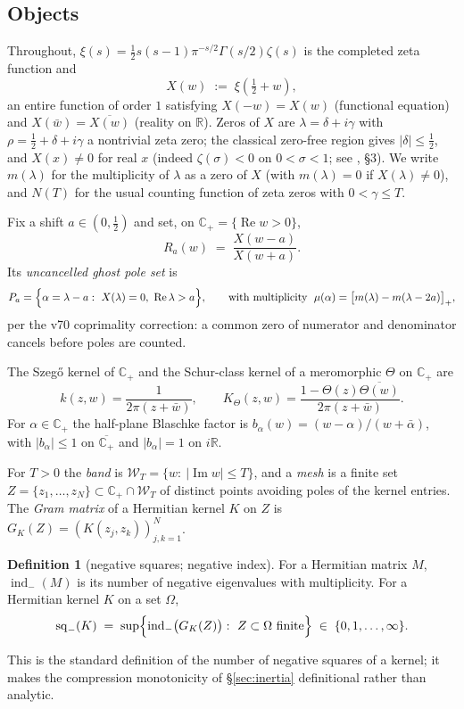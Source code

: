 \documentclass[11pt]{article}
\theoremstyle{definition}
\newtheorem{definition}[theorem]{Definition}
\theoremstyle{remark}
\newcommand{\CP}{\mathbb{C}_{+}}
\newcommand{\R}{\mathbb{R}}
\newcommand{\indm}{\operatorname{ind}_{-}}
\newcommand{\sq}{\operatorname{sq}_{-}}
\newcommand{\re}{\operatorname{Re}}
\newcommand{\im}{\operatorname{Im}}
\newcommand{\band}[1]{\mathcal{W}_{#1}}
\begin{document}
\subsection{Objects}

Throughout, $\xi(s)=\tfrac12 s(s-1)\pi^{-s/2}\Gamma(s/2)\zeta(s)$ is the
completed zeta function and
\[
X(w)\;:=\;\xi\!\left(\tfrac12+w\right),
\]
an entire function of order $1$ satisfying $X(-w)=X(w)$ (functional equation)
and $X(\bar w)=\overline{X(w)}$ (reality on $\R$). Zeros of $X$ are
$\lambda=\delta+i\gamma$ with $\rho=\tfrac12+\delta+i\gamma$ a nontrivial zeta
zero; the classical zero-free region gives $|\delta|\le\tfrac12$, and
$X(x)\neq0$ for real $x$ (indeed $\zeta(\sigma)<0$ on $0<\sigma<1$; see
\cite{ProofNote}, \S3). We write $m(\lambda)$ for the multiplicity of
$\lambda$ as a zero of $X$ (with $m(\lambda)=0$ if $X(\lambda)\neq0$), and
$N(T)$ for the usual counting function of zeta zeros with $0<\gamma\le T$.

Fix a shift $a\in(0,\tfrac12)$ and set, on $\CP=\{\re w>0\}$,
\[
R_a(w)\;=\;\frac{X(w-a)}{X(w+a)}.
\]
Its \emph{uncancelled ghost pole set} is
\[
P_a=\Bigl\{\alpha=\lambda-a:\ X(\lambda)=0,\ \re\lambda>a\Bigr\},
\qquad
\text{with multiplicity }\;
\mu(\alpha)=\bigl[m(\lambda)-m(\lambda-2a)\bigr]_{+},
\]
per the v70 coprimality correction: a common zero of numerator and denominator
cancels before poles are counted.

The Szeg\H{o} kernel of $\CP$ and the Schur-class kernel of a meromorphic
$\Theta$ on $\CP$ are
\[
k(z,w)=\frac{1}{2\pi(z+\bar w)},
\qquad
K_{\Theta}(z,w)=\frac{1-\Theta(z)\overline{\Theta(w)}}{2\pi(z+\bar w)} .
\]
For $\alpha\in\CP$ the half-plane Blaschke factor is
$b_{\alpha}(w)=(w-\alpha)/(w+\bar\alpha)$, with $|b_{\alpha}|\le1$ on
$\overline{\CP}$ and $|b_{\alpha}|=1$ on $i\R$.

For $T>0$ the \emph{band} is $\band{T}=\{w:\ |\im w|\le T\}$, and a
\emph{mesh} is a finite set $Z=\{z_1,\dots,z_N\}\subset\CP\cap\band{T}$ of
distinct points avoiding poles of the kernel entries. The \emph{Gram matrix}
of a Hermitian kernel $K$ on $Z$ is $G_K(Z)=(K(z_j,z_k))_{j,k=1}^{N}$.

\begin{definition}[negative squares; negative index]\label{def:sq}
For a Hermitian matrix $M$, $\indm(M)$ is its number of negative eigenvalues
with multiplicity. For a Hermitian kernel $K$ on a set $\Omega$,
\[
\sq(K)\;=\;\sup\Bigl\{\indm\bigl(G_K(Z)\bigr):\ Z\subset\Omega \text{ finite}\Bigr\}
\;\in\;\{0,1,\dots,\infty\}.
\]
\end{definition}
This is the standard definition of the number of negative squares of a kernel;
it makes the compression monotonicity of \S\ref{sec:inertia} definitional
rather than analytic.
\end{document}
